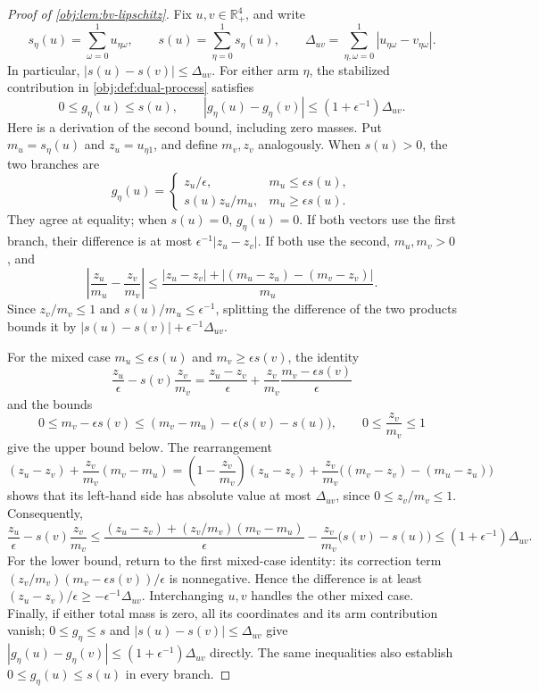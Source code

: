 \begin{proof}[Proof of \cref{obj:lem:bv-lipschitz}]
Fix \(u,v\in\mathbb R_+^4\), and write
\[
s_\eta(u)=\sum_{\omega=0}^1u_{\eta\omega},\qquad
s(u)=\sum_{\eta=0}^1s_\eta(u),\qquad
\Delta_{uv}=\sum_{\eta,\omega=0}^1|u_{\eta\omega}-v_{\eta\omega}|.
\]
In particular, \(|s(u)-s(v)|\leq\Delta_{uv}\). For either arm \(\eta\), the stabilized contribution in \cref{obj:def:dual-process} satisfies
\[
0\leq g_\eta(u)\leq s(u),\qquad
|g_\eta(u)-g_\eta(v)|
 \leq(1+\epsilon^{-1})\Delta_{uv}.
\]
Here is a derivation of the second bound, including zero masses. Put
\(m_u=s_\eta(u)\) and \(z_u=u_{\eta1}\), and define \(m_v,z_v\) analogously.
When \(s(u)>0\), the two branches are
\[
g_\eta(u)=
\begin{cases}
z_u/\epsilon,&m_u\leq\epsilon s(u),\\
s(u)z_u/m_u,&m_u\geq\epsilon s(u).
\end{cases}
\]
They agree at equality; when \(s(u)=0\), \(g_\eta(u)=0\). If both vectors use the first branch, their difference is at most
\(\epsilon^{-1}|z_u-z_v|\). If both use the second, \(m_u,m_v>0\), and
\[
\left|\frac{z_u}{m_u}-\frac{z_v}{m_v}\right|
\leq
\frac{|z_u-z_v|+
 |(m_u-z_u)-(m_v-z_v)|}{m_u}.
\]
Since \(z_v/m_v\leq1\) and \(s(u)/m_u\leq\epsilon^{-1}\), splitting the difference of the two products bounds it by
\(|s(u)-s(v)|+\epsilon^{-1}\Delta_{uv}\).

For the mixed case \(m_u\leq\epsilon s(u)\) and
\(m_v\geq\epsilon s(v)\), the identity
\[
\frac{z_u}{\epsilon}-s(v)\frac{z_v}{m_v}
=
\frac{z_u-z_v}{\epsilon}
+\frac{z_v}{m_v}\frac{m_v-\epsilon s(v)}{\epsilon}
\]
and the bounds
\[
0\leq m_v-\epsilon s(v)
\leq(m_v-m_u)-\epsilon\bigl(s(v)-s(u)\bigr),
\qquad 0\leq\frac{z_v}{m_v}\leq1
\]
give the upper bound below. The rearrangement
\[
(z_u-z_v)+\frac{z_v}{m_v}(m_v-m_u)
=\left(1-\frac{z_v}{m_v}\right)(z_u-z_v)
 +\frac{z_v}{m_v}\bigl((m_v-z_v)-(m_u-z_u)\bigr)
\]
shows that its left-hand side has absolute value at most \(\Delta_{uv}\), since \(0\leq z_v/m_v\leq1\). Consequently,
\[
\frac{z_u}{\epsilon}-s(v)\frac{z_v}{m_v}
\leq \frac{(z_u-z_v)+(z_v/m_v)(m_v-m_u)}{\epsilon}
 -\frac{z_v}{m_v}\bigl(s(v)-s(u)\bigr)
\leq(1+\epsilon^{-1})\Delta_{uv}.
\]
For the lower bound, return to the first mixed-case identity: its correction term \((z_v/m_v)(m_v-\epsilon s(v))/\epsilon\) is nonnegative. Hence the difference is at least \((z_u-z_v)/\epsilon\geq-\epsilon^{-1}\Delta_{uv}\). Interchanging \(u,v\) handles the other mixed case. Finally, if either total mass is zero, all its coordinates and its arm contribution vanish; \(0\leq g_\eta\leq s\) and \(|s(u)-s(v)|\leq\Delta_{uv}\) give \(|g_\eta(u)-g_\eta(v)|\leq(1+\epsilon^{-1})\Delta_{uv}\) directly. The same inequalities also establish \(0\leq g_\eta(u)\leq s(u)\) in every branch. %


\end{proof}
